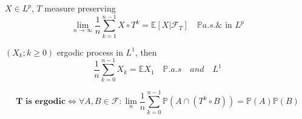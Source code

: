 \begin{theorem}
$X \in L^p$, $T$ measure preserving
	\begin{equation*}
	\lim_{n \rightarrow \infty} \frac{1}{n} \sum_{k = 1}^{n-1} X \circ T^k = \mathbb{E}[X|\mathcal{F}_T] \quad \mathbb{P}a.s. \& \text{ in $L^p$}
\end{equation*}
\end{theorem}

\begin{corollary}
	$(X_k; k \geq 0)$ ergodic process in $L^1$, then 
	\begin{equation*}
		\frac{1}{n} \sum_{k = 0}^{n-1} X_k = \mathbb{E}X_1 \quad \mathbb{P}.a.s \quad and \quad L^1
	\end{equation*}
\end{corollary}

\begin{corollary}
	\begin{equation*}
		\textbf{T is ergodic} \Leftrightarrow \forall A, B \in \mathcal{F}: \lim_n \frac{1}{n} \sum_{k = 0}^{n-1} \mathbb{P}(A \cap (T^k \circ B)) = \mathbb{P}(A)\mathbb{P}(B)
	\end{equation*}
\end{corollary}







\newpage





